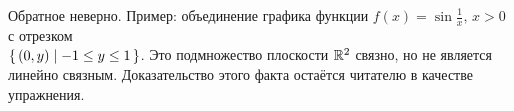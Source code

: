 \begin{nota_bene}
    Обратное неверно. Пример: объединение графика функции $f(x) = \sin \frac{1}{x}, \, x > 0$ с отрезком \\
    $\left\{\, (0,y) \mid -1 \leq y \leq 1 \,\right\}$. Это подмножество плоскости $\mathbb{R}^2$ связно, но не является линейно связным. Доказательство этого факта остаётся читателю в качестве упражнения.
\end{nota_bene}